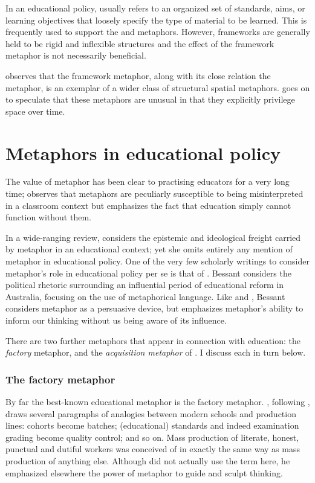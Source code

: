 In an educational policy,  usually refers to an
organized set of standards, aims, or learning objectives that loosely
specify the type of material to be learned.  This is frequently used
to support the  and  metaphors.
However, frameworks are generally held to be rigid and inflexible
structures and the effect of the framework metaphor is not necessarily
beneficial.

 observes that the framework metaphor, along with
its close relation the  metaphor, is an exemplar
of a wider class of structural spatial metaphors.
\citeauthor{paechter2004} goes on to speculate that these metaphors
are unusual in that they explicitly privilege space over time.

\section{Metaphors in educational policy}
The value of metaphor has been clear to practising educators for a
very long time;  observes that metaphors are
peculiarly susceptible to being misinterpreted in a classroom context
but emphasizes the fact that education simply cannot function without
them.

In a wide-ranging review,  considers the epistemic and
ideological freight carried by metaphor in an educational context; yet
she omits entirely any mention of metaphor in educational policy.  One
of the very few scholarly writings to consider metaphor's role in
educational policy per se is that of .  Bessant
considers the political rhetoric surrounding an influential period of
educational reform in Australia, focusing on the use of metaphorical
language.  Like  and ,
Bessant considers metaphor as a persuasive device, but emphasizes
metaphor's ability to inform our thinking without us being aware of
its influence.

There are two further metaphors that appear in connection with
education: the {\em factory} metaphor, and the {\em acquisition
  metaphor} of .  I discuss each in turn below.

\subsubsection*{The factory metaphor}

By far the best-known educational metaphor is the factory metaphor.
, following , draws several
paragraphs of analogies between modern schools and production lines:
cohorts become batches; (educational) standards and indeed examination
grading become quality control; and so on.  Mass production of
literate, honest, punctual and dutiful workers was conceived of in
exactly the same way as mass production of anything else.  Although
\citeauthor{claxton2013} did not actually use the term
 here, he emphasized elsewhere the power
of metaphor to guide and sculpt thinking.

